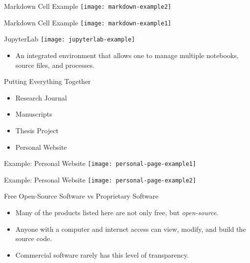 \documentclass{beamer}
\begin{document}
\begin{frame}{Markdown Cell Example}
  \center
  \texttt{[image: markdown-example2]}
\end{frame}

\begin{frame}{Markdown Cell Example}
  \center
  \texttt{[image: markdown-example1]}
\end{frame}

\begin{frame}{JupyterLab}
  \center
  \texttt{[image: jupyterlab-example]}
  \begin{itemize}
    \item An integrated environment that allows one to manage multiple notebooks, source files, and processes.
  \end{itemize}
\end{frame}

\begin{frame}{Putting Everything Together}
  \begin{itemize}
    \item Research Journal

    \item Manuscripts

    \item Thesis Project

    \item Personal Website
  \end{itemize}
\end{frame}

\begin{frame}{Example: Personal Website}
  \center
  \texttt{[image: personal-page-example1]}
\end{frame}

\begin{frame}{Example: Personal Website}
  \center
  \texttt{[image: personal-page-example2]}
\end{frame}

\begin{frame}{Free Open-Source Software vs Proprietary Software}
  \begin{itemize}
    \item Many of the products listed here are not only free, but \textit{open-source}.

    \item Anyone with a computer and internet access can view, modify, and build the source code.

    \item Commercial software rarely has this level of transparency.
  \end{itemize}
\end{frame}
\end{document}
